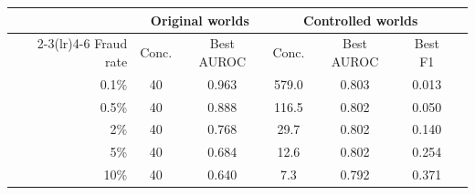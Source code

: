 \begin{tabular}{rcccccc}\toprule
 & \multicolumn{2}{c}{Original worlds} & \multicolumn{3}{c}{Controlled worlds}\\\cmidrule(lr){2-3}\cmidrule(lr){4-6}
Fraud rate & Conc. & Best AUROC & Conc. & Best AUROC & Best F1\\\midrule
0.1\% & 40 & 0.963 & 579.0 & 0.803 & 0.013\\
0.5\% & 40 & 0.888 & 116.5 & 0.802 & 0.050\\
2\% & 40 & 0.768 & 29.7 & 0.802 & 0.140\\
5\% & 40 & 0.684 & 12.6 & 0.802 & 0.254\\
10\% & 40 & 0.640 & 7.3 & 0.792 & 0.371\\
\bottomrule\end{tabular}
